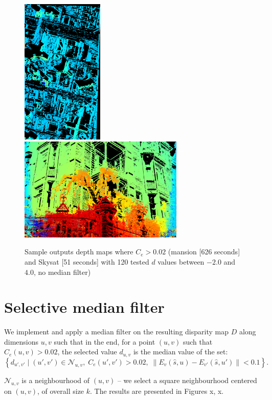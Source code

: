 \documentclass{article}
\newcommand{\norm}[1]{\left\lVert#1\right\rVert}
\theoremstyle{definition}
\begin{document}
\begin{figure}[ht]
  \centering
  \includegraphics[width=0.35\textwidth]{images/1520423162502_dmap.png}
  \includegraphics[width=0.7\textwidth]{images/1520438877175_dmap.png}
  \caption{Sample outputs depth maps where $C_e > 0.02$ (mansion [626 seconds] and Skysat [51 seconds] with 120 tested $d$ values between $-2.0$ and $4.0$, no median filter)}
  \label{fig:wconf:piles}
\end{figure}


\clearpage
\section{Selective median filter}

We implement and apply a median filter on the resulting disparity map $D$ along dimensions $u, v$ such that in the end, for a point $(u, v)$ such that $C_e (u, v) > 0.02$, the selected value $d_{u, v}$ is the median value of the set:
\[ \left\{ d_{u', v'} \; | \; (u', v') \in \mathcal{N}_{u, v}, \; C_e(u', v') > 0.02, \; \norm{E_{v}(\widehat{s}, u) - E_{v'}(\widehat{s}, u')} < 0.1 \right\}.\]

$\mathcal{N}_{u, v}$ is a neighbourhood of $(u, v)$ -- we select a square neighbourhood centered on $(u, v)$, of overall size $k$. The results are presented in Figures x, x.
\end{document}

